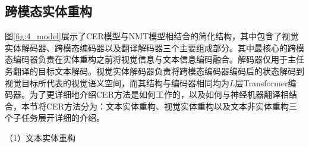 

\subsection{跨模态实体重构}
\label{sec:4_cer}

图\ref{fig:4_model}展示了CER模型与NMT模型相结合的简化结构，其中包含了视觉实体解码器、跨模态编码器以及翻译解码器三个主要组成部分。其中最核心的跨模态编码器负责在实体重构之前将视觉信息与文本信息编码融合。解码器仅用于主任务翻译的目标文本解码。视觉实体解码器负责将跨模态编码器编码后的状态解码到视觉目标所代表的视觉语义空间，而其结构与编码器相同均为$L$层Transformer编码器。为了更详细地介绍CER方法是如何工作的，以及如何与神经机器翻译相结合，本节将CER方法分为：文本实体重构、视觉实体重构以及文本非实体重构三个子任务展开详细的介绍。

{\sffamily （1）文本实体重构}

